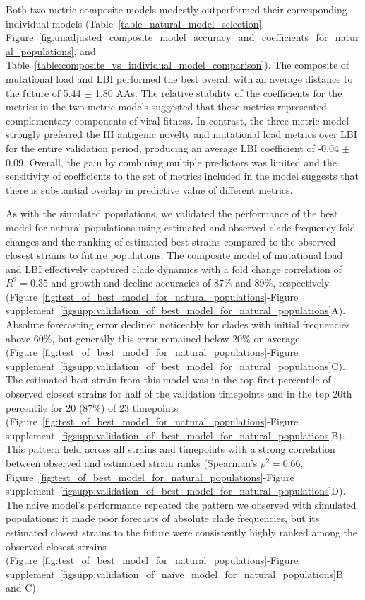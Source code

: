Both two-metric composite models modestly outperformed their corresponding individual models (Table~\ref{table_natural_model_selection}, Figure~\ref{fig:unadjusted_composite_model_accuracy_and_coefficients_for_natural_populations}, and Table~\ref{table:composite_vs_individual_model_comparison}).
The composite of mutational load and LBI performed the best overall with an average distance to the future of 5.44 $\pm$ 1.80 AAs.
The relative stability of the coefficients for the metrics in the two-metric models suggested that these metrics represented complementary components of viral fitness.
In contrast, the three-metric model strongly preferred the HI antigenic novelty and mutational load metrics over LBI for the entire validation period, producing an average LBI coefficient of -0.04 $\pm$ 0.09.
Overall, the gain by combining multiple predictors was limited and the sensitivity of coefficients to the set of metrics included in the model suggests that there is substantial overlap in predictive value of different metrics.

As with the simulated populations, we validated the performance of the best model for natural populations using estimated and observed clade frequency fold changes and the ranking of estimated best strains compared to the observed closest strains to future populations.
The composite model of mutational load and LBI effectively captured clade dynamics with a fold change correlation of $R^2 = 0.35$ and growth and decline accuracies of 87\% and 89\%, respectively (Figure~\ref{fig:test_of_best_model_for_natural_populations}-Figure supplement~\ref{figsupp:validation_of_best_model_for_natural_populations}A).
Absolute forecasting error declined noticeably for clades with initial frequencies above 60\%, but generally this error remained below 20\% on average (Figure~\ref{fig:test_of_best_model_for_natural_populations}-Figure supplement~\ref{figsupp:validation_of_best_model_for_natural_populations}C).
The estimated best strain from this model was in the top first percentile of observed closest strains for half of the validation timepoints and in the top 20th percentile for 20 (87\%) of 23 timepoints (Figure~\ref{fig:test_of_best_model_for_natural_populations}-Figure supplement~\ref{figsupp:validation_of_best_model_for_natural_populations}B).
This pattern held across all strains and timepoints with a strong correlation between observed and estimated strain ranks (Spearman's $\rho^2 = 0.66$, Figure~\ref{fig:test_of_best_model_for_natural_populations}-Figure supplement~\ref{figsupp:validation_of_best_model_for_natural_populations}D).
The naive model's performance repeated the pattern we observed with simulated populations: it made poor forecasts of absolute clade frequencies, but its estimated closest strains to the future were consistently highly ranked among the observed closest strains (Figure~\ref{fig:test_of_best_model_for_natural_populations}-Figure supplement~\ref{figsupp:validation_of_naive_model_for_natural_populations}B and C).


